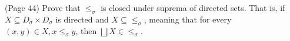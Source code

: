 (Page 44) Prove that $\leq_\sigma$ is closed under suprema of directed sets. That is, if 
$X \subseteq D_\sigma \times D_\sigma$ is directed and $X \subseteq \leq_\sigma$, meaning that for every $(x,y) \in X, x \leq_\sigma y$, then $\bigsqcup X \in \leq_\sigma$.
